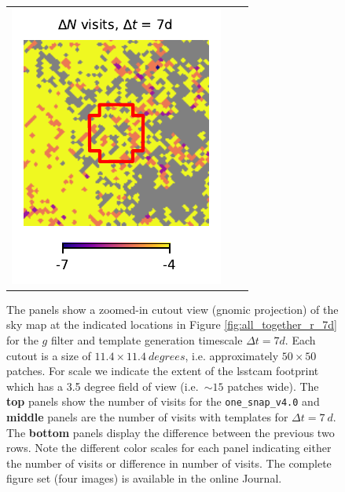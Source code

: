 \documentclass[preprintm,linenumbers]{aastex631}
\newcommand{\baseline}{\texttt{one\_snap\_v4.0}\xspace}
\begin{document}
\begin{figure}
\begin{tabular}{c c c}
				\includegraphics{results/skymaps_cutout/skymaps_cutout_delta_first_year_one_snap_v4_0_10yrs_db_noDD_noTwi_tscale-7_nside-256_doAllTemplateMetrics_reduceCount_g_GP_noDD_noTwi.pdf} \\
			\end{tabular}
			\caption{
				The panels show a zoomed-in cutout view (gnomic projection) of the sky map at the indicated locations in Figure \ref{fig:all_together_r_7d} for the $g$ filter and template generation timescale $\Delta t = 7 \si{d}$.
				Each cutout is a size of $11.4 \times 11.4\ \si{degrees}$, i.e. approximately $50 \times 50$ patches.
				For scale we indicate the extent of the \gls*{lsstcam} footprint which has a 3.5 degree field of view (i.e.\ $\sim15$ patches wide).
The \textbf{top} panels show the number of visits for the \baseline and \textbf{middle} panels are the number of visits with templates for $\Delta t = 7\ \si{d}$.
The \textbf{bottom} panels display the difference between the previous two rows.
				Note the different color scales for each panel indicating either the number of visits or difference in number of visits. 	
              The complete figure set (four images) is available in the online Journal. 
    }
	\label{fig:skymap_cutouts_g_7}
		\end{figure}
\end{document}
